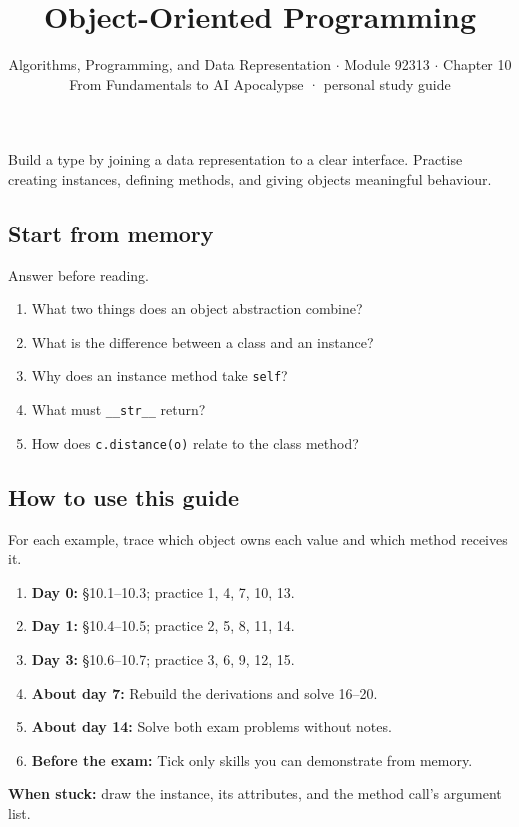 \documentclass[11pt]{article}
\title{\sffamily\bfseries\color{FAUblue}Object-Oriented Programming}
\author{Algorithms, Programming, and Data Representation \ensuremath{\cdot} Module 92313 \ensuremath{\cdot} Chapter 10\\[2pt]\small From Fundamentals to AI Apocalypse · personal study guide}
\date{}
\begin{document}
\maketitle
\begingroup\footnotesize\setlength{\parskip}{0pt}\tableofcontents\endgroup
\clearpage

{\large Build a type by joining a data representation to a clear interface. Practise creating instances, defining methods, and giving objects meaningful behaviour.}


\begin{keepsection}
\section{Start from memory}

Answer before reading.

\begin{enumerate}
\item What two things does an object abstraction combine?
\item What is the difference between a class and an instance?
\item Why does an instance method take \texttt{self}?
\item What must \texttt{\_\_str\_\_} return?
\item How does \texttt{c.distance(o)} relate to the class method?
\end{enumerate}

\end{keepsection}

\begin{keepsection}
\section{How to use this guide}

For each example, trace which object owns each value and which method receives it.

\begin{enumerate}
\item \textbf{Day 0:} §10.1–10.3; practice 1, 4, 7, 10, 13.
\item \textbf{Day 1:} §10.4–10.5; practice 2, 5, 8, 11, 14.
\item \textbf{Day 3:} §10.6–10.7; practice 3, 6, 9, 12, 15.
\item \textbf{About day 7:} Rebuild the derivations and solve 16–20.
\item \textbf{About day 14:} Solve both exam problems without notes.
\item \textbf{Before the exam:} Tick only skills you can demonstrate from memory.
\end{enumerate}

\begin{notebox}\textbf{When stuck:} draw the instance, its attributes, and the method call’s argument list.\end{notebox}
\end{keepsection}
\end{document}
